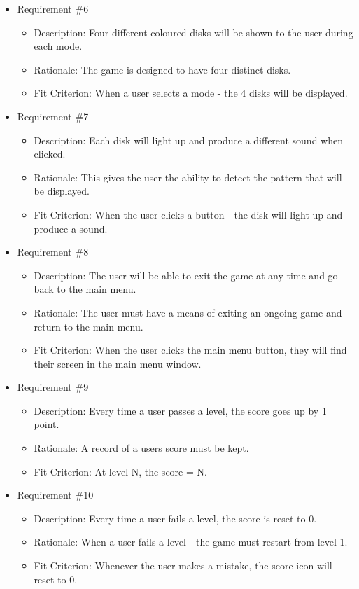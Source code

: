 \documentclass[12pt, titlepage]{article}
\begin{document}
\begin{itemize}
\item Requirement \#6
\begin{itemize}
\item Description: Four different coloured disks will be shown to the user during each mode.
\item Rationale: The game is designed to have four distinct disks.
\item Fit Criterion: When a user selects a mode - the 4 disks will be displayed. 
\end{itemize}

\item Requirement \#7
\begin{itemize}
\item Description: Each disk will light up and produce a different sound when clicked.
\item Rationale: This gives the user the ability to detect the pattern that will be displayed.
\item Fit Criterion: When the user clicks a button - the disk will light up and produce a sound.
\end{itemize}

\item Requirement \#8
\begin{itemize}
\item Description: The user will be able to exit the game at any time and go back to the main menu. 
\item Rationale: The user must have a means of exiting an ongoing game and return to the main menu.
\item Fit Criterion: When the user clicks the main menu button, they will find their screen in the main menu window.
\end{itemize}

\item Requirement \#9
\begin{itemize}
\item Description: Every time a user passes a level, the score goes up by 1 point.
\item Rationale: A record of a users score must be kept. 
\item Fit Criterion: At level N, the score = N.
\end{itemize}

\item Requirement \#10
\begin{itemize}
\item Description: Every time a user fails a level, the score is reset to 0.
\item Rationale: When a user fails a level - the game must restart from level 1.
\item Fit Criterion: Whenever the user makes a mistake, the score icon will reset to 0.
\end{itemize}


\end{itemize}
\end{document}

